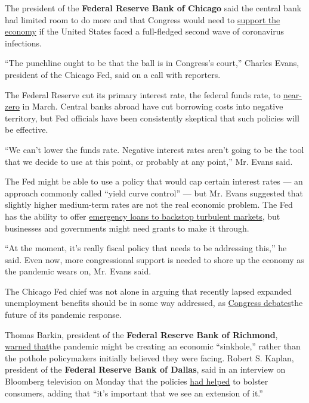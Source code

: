 The president of the \textbf{Federal Reserve Bank of Chicago} said the
central bank had limited room to do more and that Congress would need to
\href{https://www.nytimes.com/2020/08/03/business/fed-official-says-a-hard-lockdown-could-get-virus-under-control.html}{support
the economy} if the United States faced a full-fledged second wave of
coronavirus infections.

``The punchline ought to be that the ball is in Congress's court,''
Charles Evans, president of the Chicago Fed, said on a call with
reporters.

The Federal Reserve cut its primary interest rate, the federal funds
rate, to
\href{https://www.nytimes.com/2020/07/29/business/economy/federal-reserve-meeting-interest-rates.html}{near-zero}
in March. Central banks abroad have cut borrowing costs into negative
territory, but Fed officials have been consistently skeptical that such
policies will be effective.

``We can't lower the funds rate. Negative interest rates aren't going to
be the tool that we decide to use at this point, or probably at any
point,'' Mr. Evans said.

The Fed might be able to use a policy that would cap certain interest
rates --- an approach commonly called ``yield curve control'' --- but
Mr. Evans suggested that slightly higher medium-term rates are not the
real economic problem. The Fed has the ability to offer
\href{https://www.nytimes.com/2020/07/28/business/economy/coronavirus-federal-reserve-policy.html}{emergency
loans to backstop turbulent markets}, but businesses and governments
might need grants to make it through.

``At the moment, it's really fiscal policy that needs to be addressing
this,'' he said. Even now, more congressional support is needed to shore
up the economy as the pandemic wears on, Mr. Evans said.

The Chicago Fed chief was not alone in arguing that recently lapsed
expanded unemployment benefits should be in some way addressed, as
\href{https://www.nytimes.com/2020/08/02/us/politics/coronavirus-jobless-aid.html}{Congress
debates}the future of its pandemic response.

Thomas Barkin, president of the \textbf{Federal Reserve Bank of
Richmond},
\href{https://www.reuters.com/article/usa-fed-barkin/feds-barkin-says-economy-faces-sinkhole-without-more-fiscal-support-idUSW1N2B8003}{warned
that}the pandemic might be creating an economic ``sinkhole,'' rather
than the pothole policymakers initially believed they were facing.
Robert S. Kaplan, president of the \textbf{Federal Reserve Bank of
Dallas}, said in an interview on Bloomberg television on Monday that the
policies
\href{https://www.bloomberg.com/news/articles/2020-08-03/extension-of-jobless-benefits-to-buoy-growth-fed-s-kaplan-says?srnd=premium\&sref=oZtxD6sa}{had
helped} to bolster consumers, adding that ``it's important that we see
an extension of it.''

